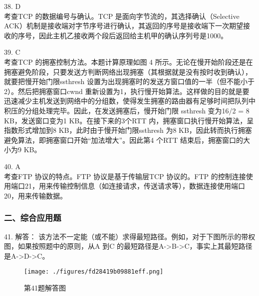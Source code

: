 38. D \\
考查TCP 的数据编号与确认。TCP 是面向字节流的，其选择确认（Selective ACK）机制是接收端对字节序号进行确认，其返回的序号是接收端下一次期望接收的序号，因此主机乙接收两个段后返回给主机甲的确认序列号是1000。

39. C \\
考查TCP 的拥塞控制方法。本题计算原理如图 4 所示。无论在慢开始阶段还是在拥塞避免阶段，只要发送方判断网络出现拥塞（其根据就是没有按时收到确认），就要把慢开始门限ssthresh 设置为出现拥塞时的发送方窗口值的一半（但不能小于2）。然后把拥塞窗口cwnd 重新设置为1，执行慢开始算法。这样做的目的就是要迅速减少主机发送到网络中的分组数，使得发生拥塞的路由器有足够时间把队列中积压的分组处理完毕。因此，在发送拥塞后，慢开始门限 ssthresh 变为16/2 = 8 KB，发送窗口变为1 KB。在接下来的3个RTT 内，拥塞窗口执行慢开始算法，呈指数形式增加到8 KB，此时由于慢开始门限ssthresh 为8 KB，因此转而执行拥塞避免算法，即拥塞窗口开始“加法增大”。因此第4 个RTT 结束后，拥塞窗口的大小为9 KB。

40. A \\
考查FTP 协议的特点。FTP 协议是基于传输层TCP 协议的。FTP 的控制连接使用端口21，用来传输控制信息（如连接请求，传送请求等），数据连接使用端口20，用来传输数据。

\subsubsection{二、综合应用题}
41. 解答：
该方法不一定能（或不能）求得最短路径。例如，对于下图所示的带权图，如果按照题中的原则，从A 到C 的最短路径是A->B->C，事实上其最短路径是A->D->C。
\begin{figure}[ht]
\centering
\texttt{[image: ./figures/fd28419b09881eff.png]}
\caption{第41题解答图} \label{fig_CSN09_6}
\end{figure}

